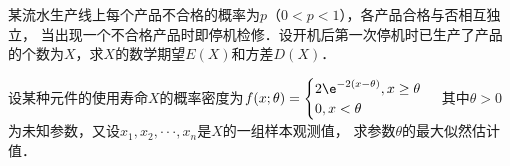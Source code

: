 \documentclass[plain,noanswer,medmath]{../../template/jnuexam}
\begin{document}

\begin{problem}
某流水生产线上每个产品不合格的概率为$p$（$0 < p < 1$），各产品合格与否相互独立，
当出现一个不合格产品时即停机检修．设开机后第一次停机时已生产了产品的个数为$X$，求$X$的数学期望$E(X)$和方差$D(X)$．
\end{problem}



\begin{problem}
设某种元件的使用寿命$X$的概率密度为$f(x;\theta) = \begin{cases}
  2\e^{- 2(x - \theta)},x \ge \theta \\
  0, x < \theta
\end{cases}$ 其中$\theta > 0$为未知参数，又设$x_1,x_2, \cdot \cdot \cdot ,x_n$是$X$的一组样本观测值，
求参数$\theta$的最大似然估计值．
\end{problem}
\end{document}
